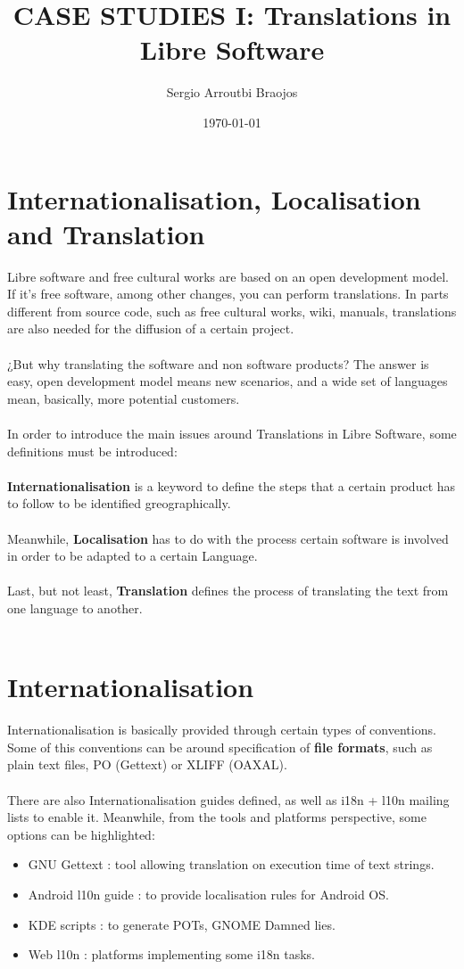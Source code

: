 \documentclass[11pt]{article}
\title{\textbf{CASE STUDIES I: Translations in Libre Software}}
\author{Sergio Arroutbi Braojos}
\date{\today}
\begin{document}
\maketitle

\section{Internationalisation, Localisation and Translation}
Libre software and free cultural works are based on an  open development model. If it’s free software, among other changes, you can perform translations. In parts different from source code, such as free cultural works, wiki, manuals, translations are also needed for the diffusion of a certain project.\\
\\
¿But why translating the software and non software products? The answer is easy, open development model means new scenarios, and a wide set of languages mean, basically, more potential customers.\\
\\
In order to introduce the main issues around Translations in Libre Software, some definitions must be introduced:\\
\\
\textbf{Internationalisation} is a keyword to define the steps that a certain product has to follow to be identified greographically.\\
\\
Meanwhile, \textbf{Localisation} has to do with the process certain software is involved in order to be adapted to a certain Language.\\
\\
Last, but not least, \textbf{Translation} defines the process of translating the text from one language to another.\\
\\

\section{Internationalisation}
Internationalisation is basically provided through certain types of conventions. Some of this conventions can be around specification of \textbf{file formats}, such as plain text files, PO (Gettext) or XLIFF (OAXAL).\\
\\
There are also Internationalisation guides defined, as well as i18n + l10n mailing lists to enable it.
Meanwhile, from the tools and platforms perspective, some options can be highlighted:
\begin{itemize}
\item{GNU Gettext} : tool allowing translation on execution time of text strings.
\item{Android l10n guide} : to provide localisation rules for Android OS.
\item{KDE scripts} : to generate POTs, GNOME Damned lies.
\item{Web l10n} : platforms implementing some i18n tasks.
\end{itemize}
\end{document}
